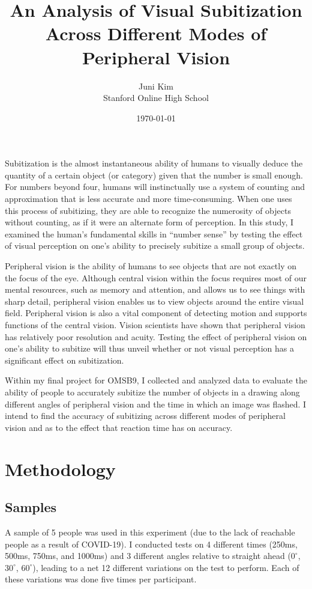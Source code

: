 \documentclass[12pt]{article}
\title{An Analysis of Visual Subitization Across Different Modes of Peripheral
Vision}
\author{Juni Kim \\
Stanford Online High School}
\date{\today}
\begin{document}
 

\maketitle

Subitization is the almost instantaneous ability of humans to visually deduce
the quantity of a certain object (or category) given that the number is small
enough. For numbers beyond four, humans will instinctually use a system of
counting and approximation that is less accurate and more time-consuming. When
one uses this process of subitizing, they are able to recognize the numerosity
of objects without counting, as if it were an alternate form of perception.  In
this study, I examined the human’s fundamental skills in “number sense” by
testing the effect of visual perception on one’s ability to precisely subitize
a small group of objects. 

Peripheral vision is the ability of humans to see objects that are not exactly
on the focus of the eye. Although central vision within the focus requires most
of our mental resources, such as memory and attention, and allows us to see
things with sharp detail, peripheral vision enables us to view objects around
the entire visual field. Peripheral vision is also a vital component of
detecting motion and supports functions of the central vision. Vision
scientists have shown that peripheral vision has relatively poor resolution and
acuity. Testing the effect of peripheral vision on one’s
ability to subitize will thus unveil whether or not visual perception has a
significant effect on subitization.

Within my final project for OMSB9, I collected and analyzed data to evaluate the
ability of people to accurately subitize the number of objects in a drawing along
different angles of peripheral vision and the time in which an image was
flashed. I intend to find the accuracy of subitizing across different modes of
peripheral vision and as to the effect that reaction time has on accuracy.

\section{Methodology}

\subsection{Samples}
A sample of 5 people was used in this experiment (due to the lack of reachable
people as a result of COVID-19). I conducted tests on 4 different times (250ms,
500ms, 750ms, and 1000ms) and 3 different angles relative to straight ahead
($0^{\circ}$, $30^{\circ}$, $60^{\circ}$), leading to a net 12 different
variations on the test to perform. Each of these variations was done five times
per participant.
\end{document}
